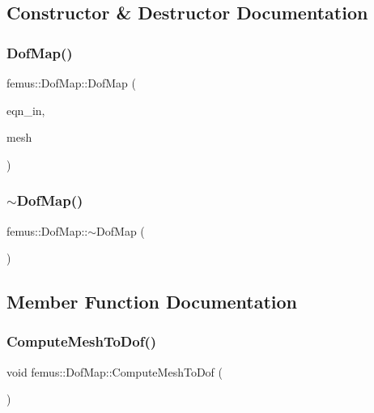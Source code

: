 \subsection{Constructor \& Destructor Documentation}
\mbox{\label{classfemus_1_1_dof_map_ad2189a8337b8a34227dfccf813c95979}} 
\subsubsection{\texorpdfstring{Dof\+Map()}{DofMap()}}
{\footnotesize\ttfamily femus\+::\+Dof\+Map\+::\+Dof\+Map (\begin{DoxyParamCaption}\item[{const \mbox{\hyperlink{classfemus_1_1_system_two}{System\+Two}} $\ast$}]{eqn\+\_\+in,  }\item[{const \mbox{\hyperlink{classfemus_1_1_multi_level_mesh_two}{Multi\+Level\+Mesh\+Two}} \&}]{mesh }\end{DoxyParamCaption})}

\mbox{\label{classfemus_1_1_dof_map_ae4d78670db55aef9a236e0c6af24e7e3}} 
\subsubsection{\texorpdfstring{$\sim$\+Dof\+Map()}{~DofMap()}}
{\footnotesize\ttfamily femus\+::\+Dof\+Map\+::$\sim$\+Dof\+Map (\begin{DoxyParamCaption}{ }\end{DoxyParamCaption})}



\subsection{Member Function Documentation}
\mbox{\label{classfemus_1_1_dof_map_a138d18259b03814567d8795e0d462aca}} 
\subsubsection{\texorpdfstring{Compute\+Mesh\+To\+Dof()}{ComputeMeshToDof()}}
{\footnotesize\ttfamily void femus\+::\+Dof\+Map\+::\+Compute\+Mesh\+To\+Dof (\begin{DoxyParamCaption}{ }\end{DoxyParamCaption})}

